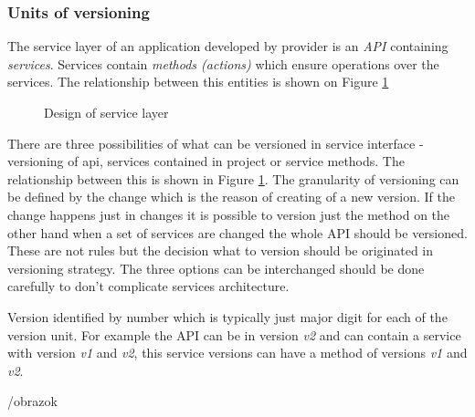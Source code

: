 \subsubsection{Units of versioning}
\label{sec:units}

The service layer of an application developed by provider is an \emph{API} containing \emph{services}. Services contain \emph{methods (actions)} which ensure operations over the services. The relationship between this entities is shown on Figure \ref{fig:service-layer-design}

\begin{figure}[htp] 
\caption{Design of service layer}
\label{fig:service-layer-design}
\end{figure} 

There are three possibilities of what can be versioned in service interface - versioning of \gls{api}, services contained in project or service methods. The relationship between this is shown in Figure \ref{fig:service-layer-design}. The granularity of versioning can be defined by the change which is the reason of creating of a new version. If the change happens just in changes it is possible to version just the method on the other hand when a set of services are changed the whole API should be versioned. These are not rules but the decision what to version should be originated in versioning strategy. The three options can be interchanged should be done carefully to don't complicate services architecture.

Version identified by number which is typically just major digit for each of the version unit. For example the API can be in version \emph{v2} and can contain a service with version \emph{v1} and \emph{v2}, this service versions can have a method of versions \emph{v1} and \emph{v2}.

/obrazok

